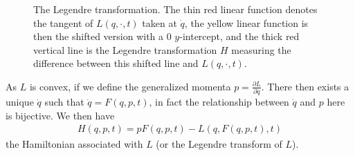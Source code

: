 \begin{ex}
\begin{figure}[h!]
	\caption{The Legendre transformation. The thin red linear function denotes the tangent of $L(q, \cdot, t)$ taken at  $\dot{q}$, the yellow linear function is then the shifted version with a 0 $y$-intercept, and the thick red vertical line is the Legendre transformation $H$ measuring the difference between this shifted line and $L(q,\cdot, t)$.}
	\label{fig:legendre_trafo}
\end{figure}

As $L$ is convex, if we define the generalized momenta $p=\frac{\partial L}{\partial \dot{q}}$. There then exists a unique $\dot{q}$ such that $\dot{q} = F(q,p,t)$, in fact the relationship between $\dot{q}$ and $p$ here is bijective. We then have
\begin{align}
	H(q,p,t) = p F(q,p,t) - L (q, F(q,p,t), t)
\end{align}
the Hamiltonian associated with $L$ (or the Legendre transform of $L$).


\end{ex}
